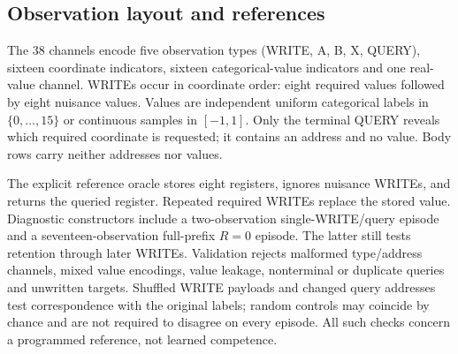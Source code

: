 \subsection{Observation layout and references}
The 38 channels encode five observation types (WRITE, A, B, X, QUERY), sixteen coordinate indicators, sixteen categorical-value indicators and one real-value channel. WRITEs occur in coordinate order: eight required values followed by eight nuisance values. Values are independent uniform categorical labels in $\{0,\ldots,15\}$ or continuous samples in $[-1,1]$. Only the terminal QUERY reveals which required coordinate is requested; it contains an address and no value. Body rows carry neither addresses nor values.

The explicit reference oracle stores eight registers, ignores nuisance WRITEs, and returns the queried register. Repeated required WRITEs replace the stored value. Diagnostic constructors include a two-observation single-WRITE/query episode and a seventeen-observation full-prefix $R=0$ episode. The latter still tests retention through later WRITEs. Validation rejects malformed type/address channels, mixed value encodings, value leakage, nonterminal or duplicate queries and unwritten targets. Shuffled WRITE payloads and changed query addresses test correspondence with the original labels; random controls may coincide by chance and are not required to disagree on every episode. All such checks concern a programmed reference, not learned competence.

